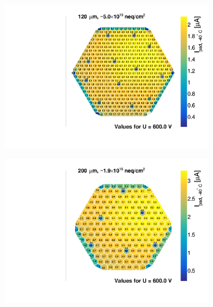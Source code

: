 \begin{figure}
	\captionsetup[subfigure]{aboveskip=-1pt,belowskip=-1pt}
	\centering
	\begin{subfigure}[b]{0.32\textwidth}
		\includegraphics[width=0.999\textwidth]{plots/iv_hexplots/3009.pdf}
		\subcaption{
		}
		\label{plot:iv_hexplot_3009}
	\end{subfigure}
	\hfill
	\begin{subfigure}[b]{0.32\textwidth}
		\includegraphics[width=0.999\textwidth]{plots/iv_hexplots/0541_04.pdf}
		\subcaption{
		}
		\label{plot:iv_hexplot_0541_04}
	\end{subfigure}
	\hfill	
	\begin{subfigure}[b]{0.32\textwidth}

\end{subfigure}
\end{figure}

